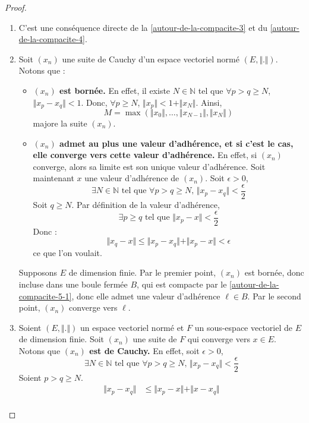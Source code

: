   \begin{proof}
    \begin{enumerate}[label={\bfseries(\roman*)}]
      \item C'est une conséquence directe de la \cref{autour-de-la-compacite-3} et du \cref{autour-de-la-compacite-4}.
      \item Soit $(x_n)$ une suite de Cauchy d'un espace vectoriel normé $(E, \Vert . \Vert)$. Notons que :
      \begin{itemize}
        \item \textbf{$(x_n)$ est bornée.} En effet, il existe $N \in \mathbb{N}$ tel que $\forall p > q \geq N$, $\Vert x_p - x_q \Vert < 1$. Donc, $\forall p \geq N$, $\Vert x_p \Vert < 1 + \Vert x_N \Vert$. Ainsi,
        \[ M = \max(\Vert x_0 \Vert, \dots, \Vert x_{N-1} \Vert, \Vert x_N \Vert) \]
        majore la suite $(x_n)$.
        \item \textbf{$(x_n)$ admet au plus une valeur d'adhérence, et si c'est le cas, elle converge vers cette valeur d'adhérence.} En effet, si $(x_n)$ converge, alors sa limite est son unique valeur d'adhérence. Soit maintenant $x$ une valeur d'adhérence de $(x_n)$. Soit $\epsilon > 0$,
        \[ \exists N \in \mathbb{N} \text{ tel que } \forall p > q \geq N, \, \Vert x_p - x_q \Vert < \frac{\epsilon}{2} \]
        Soit $q \geq N$. Par définition de la valeur d'adhérence,
        \[ \exists p \geq q \text{ tel que } \Vert x_p - x \Vert < \frac{\epsilon}{2} \]
        Donc :
        \[ \Vert x_q - x \Vert \leq \Vert x_p - x_q \Vert + \Vert x_p - x \Vert < \epsilon \]
        ce que l'on voulait.
      \end{itemize}
      Supposons $E$ de dimension finie. Par le premier point, $(x_n)$ est bornée, donc incluse dans une boule fermée $B$, qui est compacte par le \cref{autour-de-la-compacite-5-1}, donc elle admet une valeur d'adhérence $\ell \in B$. Par le second point, $(x_n)$ converge vers $\ell$.
      \item Soient $(E, \Vert . \Vert)$ un espace vectoriel normé et $F$ un sous-espace vectoriel de $E$ de dimension finie. Soit $(x_n)$ une suite de $F$ qui converge vers $x \in E$. Notons que \textbf{$(x_n)$ est de Cauchy.} En effet, soit $\epsilon > 0$,
      \[ \exists N \in \mathbb{N} \text{ tel que } \forall p > q \geq N, \, \Vert x_p - x_q \Vert < \frac{\epsilon}{2} \]
      Soient $p > q \geq N$.
      \begin{align*}
        \Vert x_p - x_q \Vert &\leq \Vert x_p - x \Vert + \Vert x - x_q \Vert \\

\end{align*}
\end{enumerate}
\end{proof}

